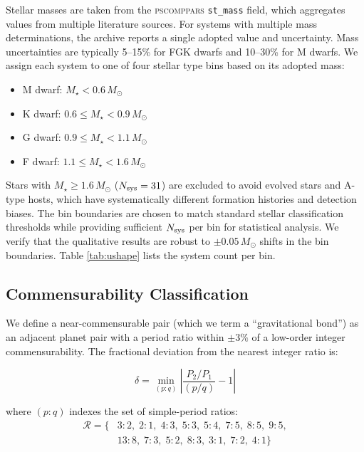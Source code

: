 \documentclass[twocolumn,usenatbib]{mnras}
\begin{document}
Stellar masses are taken from the \textsc{pscomppars} \texttt{st\_mass} field,
which aggregates values from multiple literature sources. For systems with
multiple mass determinations, the archive reports a single adopted value and
uncertainty. Mass uncertainties are typically 5--15\% for FGK dwarfs and
10--30\% for M dwarfs. We assign each system to one of four stellar type bins
based on its adopted mass:

\begin{itemize}
  \item M dwarf: $M_\star < 0.6\,M_\odot$
  \item K dwarf: $0.6 \leq M_\star < 0.9\,M_\odot$
  \item G dwarf: $0.9 \leq M_\star < 1.1\,M_\odot$
  \item F dwarf: $1.1 \leq M_\star < 1.6\,M_\odot$
\end{itemize}

Stars with $M_\star \geq 1.6\,M_\odot$ ($N_{\rm sys} = 31$) are excluded to
avoid evolved stars and A-type hosts, which have systematically different
formation histories and detection biases. The bin boundaries are chosen to
match standard stellar classification thresholds while providing sufficient
$N_{\rm sys}$ per bin for statistical analysis. We verify that the qualitative
results are robust to $\pm 0.05\,M_\odot$ shifts in the bin boundaries. Table
\ref{tab:ushape} lists the system count per bin.

\subsection{Commensurability Classification}
\label{sec:bond_classification}

We define a near-commensurable pair (which we term a
``gravitational bond'') as an adjacent planet pair with a period ratio within
$\pm 3\%$ of a low-order integer commensurability. The fractional deviation
from the nearest integer ratio is:

\begin{equation}
\delta = \min_{(p:q)} \left| \frac{P_2/P_1}{(p/q)} - 1 \right|
\label{eq:delta}
\end{equation}

where $(p:q)$ indexes the set of simple-period ratios:
\begin{equation}
\begin{split}
\mathcal{R} = \{ &3:2,\; 2:1,\; 4:3,\; 5:3,\; 5:4,\; 7:5,\; 8:5,\; 9:5,\\
                &13:8,\; 7:3,\; 5:2,\; 8:3,\; 3:1,\; 7:2,\; 4:1 \}
\end{split}
\end{equation}
\end{document}
